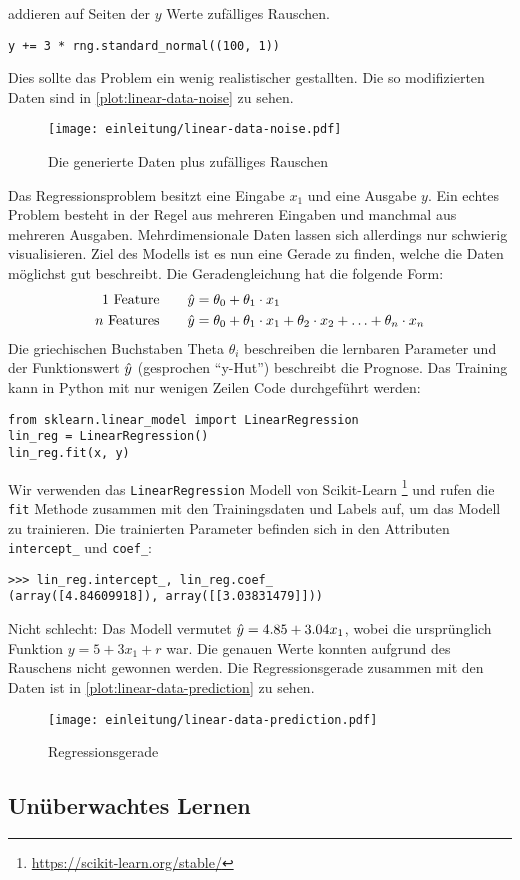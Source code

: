 addieren auf Seiten der $y$ Werte zufälliges Rauschen.
\begin{lstlisting}
y += 3 * rng.standard_normal((100, 1))
\end{lstlisting}
Dies sollte das Problem ein wenig realistischer gestallten.
Die so modifizierten Daten sind in \autoref{plot:linear-data-noise} zu sehen.
\begin{figure}[h]
  \centering
  \texttt{[image: einleitung/linear-data-noise.pdf]}
  \caption{Die generierte Daten plus zufälliges Rauschen}
  \label{plot:linear-data-noise}
\end{figure}
Das Regressionsproblem besitzt eine Eingabe $x_1$ und eine Ausgabe $y$.
Ein echtes Problem besteht in der Regel aus mehreren Eingaben und manchmal
aus mehreren Ausgaben. Mehrdimensionale Daten lassen sich allerdings nur schwierig
visualisieren. Ziel des Modells ist es nun eine Gerade zu finden, welche die
Daten möglichst gut beschreibt. Die Geradengleichung hat die folgende Form:
\begin{align}
  \text{1 Feature}\qquad    & \hat{y} = \theta_0 + \theta_1 \cdot x_1   \\
  \text{$n$ Features}\qquad & \hat{y} = \theta_0 + \theta_1 \cdot x_1 +
  \theta_2 \cdot x_2 + \ldots + \theta_n \cdot x_n
\end{align}
Die griechischen Buchstaben Theta $\theta_i$ beschreiben die lernbaren Parameter und
der Funktionswert $\hat{y}$ (gesprochen \enquote{y-Hut}) beschreibt die Prognose.
Das Training kann in Python mit nur wenigen Zeilen Code durchgeführt werden:
\begin{lstlisting}
from sklearn.linear_model import LinearRegression
lin_reg = LinearRegression()
lin_reg.fit(x, y)
\end{lstlisting}
Wir verwenden das \lstinline{LinearRegression} Modell von Scikit-Learn
\footnote{\url{https://scikit-learn.org/stable/}} und rufen die \lstinline{fit}
Methode zusammen mit den Trainingsdaten und Labels auf, um das Modell zu trainieren.
Die trainierten Parameter befinden sich in den Attributen \lstinline{intercept_}
und \lstinline{coef_}:
\begin{lstlisting}
>>> lin_reg.intercept_, lin_reg.coef_
(array([4.84609918]), array([[3.03831479]]))
\end{lstlisting}
Nicht schlecht: Das Modell vermutet $\hat{y} = 4.85 + 3.04x_1$, wobei die ursprünglich
Funktion $y = 5 + 3x_1 + r$ war. Die genauen Werte konnten aufgrund des Rauschens
nicht gewonnen werden. Die Regressionsgerade zusammen mit den Daten ist
in \autoref{plot:linear-data-prediction} zu sehen.
\begin{figure}[!h]
  \centering
  \texttt{[image: einleitung/linear-data-prediction.pdf]}
  \caption{Regressionsgerade}
  \label{plot:linear-data-prediction}
\end{figure}

\subsection{Unüberwachtes Lernen}